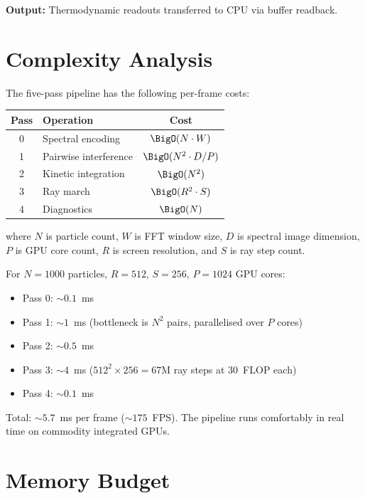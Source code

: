 \textbf{Output:} Thermodynamic readouts transferred to CPU via buffer readback.

\section{Complexity Analysis}
\label{sec:complexity}

\begin{theorem}
The five-pass pipeline has the following per-frame costs:
\begin{center}
\begin{tabular}{clc}
\toprule
Pass & Operation & Cost \\
\midrule
0 & Spectral encoding & $\BigO(N \cdot W)$ \\
1 & Pairwise interference & $\BigO(N^2 \cdot D/P)$ \\
2 & Kinetic integration & $\BigO(N^2)$ \\
3 & Ray march & $\BigO(R^2 \cdot S)$ \\
4 & Diagnostics & $\BigO(N)$ \\
\bottomrule
\end{tabular}
\end{center}
where $N$ is particle count, $W$ is FFT window size, $D$ is spectral image dimension, $P$ is GPU core count, $R$ is screen resolution, and $S$ is ray step count.
\end{theorem}

For $N = 1000$ particles, $R = 512$, $S = 256$, $P = 1024$ GPU cores:
\begin{itemize}
    \item Pass 0: $\sim 0.1$~ms
    \item Pass 1: $\sim 1$~ms (bottleneck is $N^2$ pairs, parallelised over $P$ cores)
    \item Pass 2: $\sim 0.5$~ms
    \item Pass 3: $\sim 4$~ms ($512^2 \times 256 = 67$M ray steps at 30~FLOP each)
    \item Pass 4: $\sim 0.1$~ms
\end{itemize}

Total: $\sim 5.7$~ms per frame ($\sim 175$~FPS). The pipeline runs comfortably in real time on commodity integrated GPUs.

\section{Memory Budget}
\label{sec:memory}

